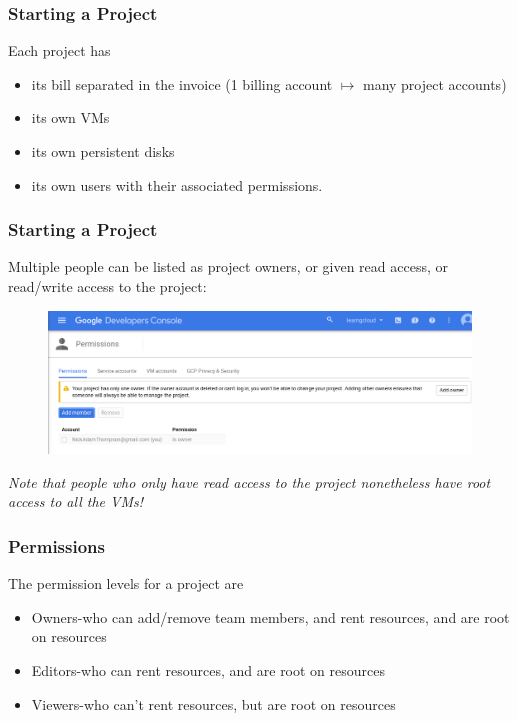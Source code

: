 \documentclass[9pt]{beamer}
\begin{document}
\begin{frame}[fragile]
  \frametitle{Starting a Project}
  Each project has
  \pause
  \begin{itemize}
  \item its bill separated in the invoice (1 billing account $\mapsto$ many project accounts)
    \pause
  \item its own VMs
    \pause
  \item its own persistent disks
    \pause
  \item its own users with their associated permissions.
  \end{itemize}
\end{frame}

\begin{frame}[fragile]
  \frametitle{Starting a Project}
  Multiple people can be listed as project owners, or given read access, or read/write access to the project:
  \begin{figure}
    \includegraphics[scale=0.2]{figures/AddProjectOwner.png}
  \end{figure}
  \emph{Note that people who only have read access to the project nonetheless have root access to all the VMs!}
\end{frame}

\begin{frame}[fragile]
  \frametitle{Permissions}
The permission levels for a project are
\begin{itemize}
\pause
\item Owners-who can add/remove team members, and rent resources, and are root on resources
\pause	
\item Editors-who can rent resources, and are root on resources
\pause
\item Viewers-who can't rent resources, but are root on resources
\end{itemize}
\end{frame}
\end{document}
